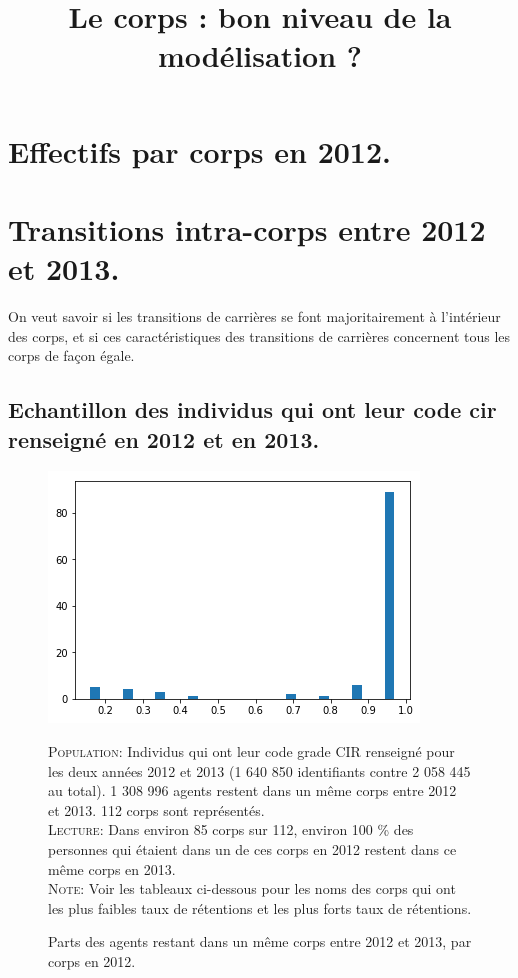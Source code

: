 \documentclass[11pt,a4paper]{article}
\begin{document}
\title{Le corps : bon niveau de la modélisation ?}


\author{}


\maketitle

\section{Effectifs par corps en 2012.}


\section{Transitions intra-corps entre 2012 et 2013.}


On veut savoir si les transitions de carrières se font majoritairement à l'intérieur des corps, et si ces caractéristiques des transitions de carrières concernent tous les corps de façon égale.


\subsection{Echantillon des individus qui ont leur code cir renseigné en 2012 et en 2013.}

\begin{figure}[H] 
	\caption{Parts des agents restant dans un même corps entre 2012 et 2013, par corps en 2012.}
	\label{transit1} 
	\includegraphics[scale = 0.7]{transitions_intra_corps_2012_2013_c_cir.png} 
	\begin{minipage}{15cm}
		\footnotesize
		\textsc{Population:} Individus qui ont leur code grade CIR renseigné pour les deux années 2012 et 2013 (1 640 850 identifiants contre 2 058 445 au total). 1 308 996 agents restent dans un même corps entre 2012 et 2013. 112 corps sont représentés.\\
		\textsc{Lecture:} Dans environ 85 corps sur 112, environ 100 \% des personnes qui étaient dans un de ces corps en 2012 restent dans ce même corps en 2013. \\
		\textsc{Note:} Voir les tableaux ci-dessous pour les noms des corps qui ont les plus faibles taux de rétentions et les plus forts taux de rétentions.
	\end{minipage}
\end{figure}
\end{document}
